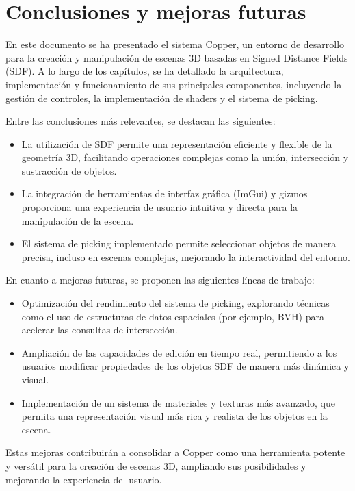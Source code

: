\chapter{Conclusiones y mejoras futuras}

En este documento se ha presentado el sistema Copper, un entorno de desarrollo
para la creación y manipulación de escenas 3D basadas en Signed Distance Fields
(SDF). A lo largo de los capítulos, se ha detallado la arquitectura,
implementación y funcionamiento de sus principales componentes, incluyendo la
gestión de controles, la implementación de shaders y el sistema de picking.

Entre las conclusiones más relevantes, se destacan las siguientes:

\begin{itemize}
    \item La utilización de SDF permite una representación eficiente y flexible de la
          geometría 3D, facilitando operaciones complejas como la unión, intersección y
          sustracción de objetos.
    \item La integración de herramientas de interfaz gráfica (ImGui) y gizmos proporciona
          una experiencia de usuario intuitiva y directa para la manipulación de la
          escena.
    \item El sistema de picking implementado permite seleccionar objetos de manera
          precisa, incluso en escenas complejas, mejorando la interactividad del entorno.
\end{itemize}

En cuanto a mejoras futuras, se proponen las siguientes líneas de trabajo:

\begin{itemize}
    \item Optimización del rendimiento del sistema de picking, explorando técnicas como
          el uso de estructuras de datos espaciales (por ejemplo, BVH) para acelerar las
          consultas de intersección.
    \item Ampliación de las capacidades de edición en tiempo real, permitiendo a los
          usuarios modificar propiedades de los objetos SDF de manera más dinámica y
          visual.
    \item Implementación de un sistema de materiales y texturas más avanzado, que permita
          una representación visual más rica y realista de los objetos en la escena.
\end{itemize}

Estas mejoras contribuirán a consolidar a Copper como una herramienta potente y
versátil para la creación de escenas 3D, ampliando sus posibilidades y
mejorando la experiencia del usuario.
